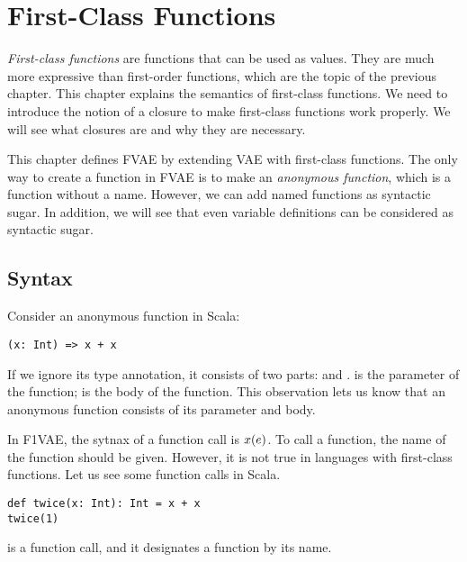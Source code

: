 \setchapterpreamble[u]{\margintoc}
\chapter{First-Class Functions}

\renewcommand{\plang}{\textsf{VAE}\xspace}
\renewcommand{\lang}{\textsf{FVAE}\xspace}

\textit{First-class functions} are functions that
can be used as values. They are much more expressive than first-order functions,
which are the topic of the previous chapter. This chapter explains the semantics
of first-class functions. We need to introduce the notion of a closure to make
first-class functions work properly. We will see what closures are and why they
are necessary.

This chapter defines \lang by extending \plang with first-class functions.
The only way to create a function in \lang is to make an \textit{anonymous
function}, which is a function without a name.
However, we can add named functions as syntactic sugar. In addition,
we will see that even variable definitions can be considered as syntactic sugar.

\section{Syntax}

Consider an anonymous function in Scala:

\begin{verbatim}
(x: Int) => x + x
\end{verbatim}

If we ignore its type annotation, it consists of two parts:  and .  is the parameter of the function;  is the body of the
function. This observation lets us know that an anonymous function consists of
its parameter and body.

In \textsf{F1VAE}, the sytnax of a function call is $x(e)$. To call a
function, the name of the function should be given. However, it is not true in
languages with first-class functions. Let us see some function calls in Scala.

\begin{verbatim}
def twice(x: Int): Int = x + x
twice(1)
\end{verbatim}

 is a function call, and it designates a function by its name.

